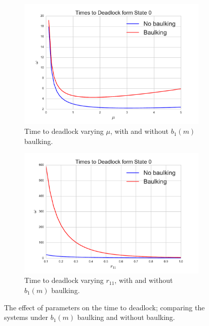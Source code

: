 \documentclass{article}
\begin{document}
\begin{figure}[!hbtp]
\begin{center}
\begin{subfigure}[b]{0.45\textwidth}
    \includegraphics[width=\textwidth]{img/baulk1_varymu.pdf}
    \caption{Time to deadlock varying $\mu$, with and without $b_1(m)$ baulking.}
    \label{fig:baulk1_mu}
\end{subfigure}
\begin{subfigure}[b]{0.45\textwidth}
    \includegraphics[width=\textwidth]{img/baulk1_varyr11.pdf}
    \caption{Time to deadlock varying $r_{11}$, with and without $b_1(m)$ baulking.}
    \label{fig:baulk1_r11}
\end{subfigure}
\end{center}
\caption{The effect of parameters on the time to deadlock; comparing the systems under $b_1(m)$ baulking and without baulking.}
\label{fig:compare_b1_params}
\end{figure}
\end{document}
